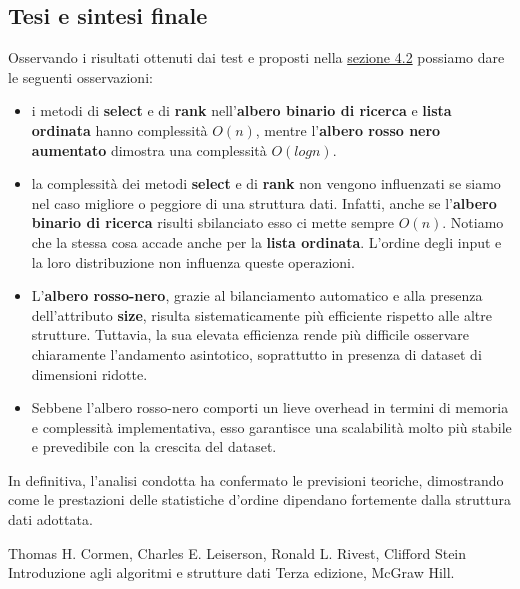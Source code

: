 \documentclass[10pt]{article}
\begin{document}
\newpage
\subsection{Tesi e sintesi finale}
Osservando i risultati ottenuti dai test e proposti nella  \hyperref[risultati sperimentali]{sezione 4.2} possiamo dare le seguenti osservazioni:
\begin{itemize}
    \item i metodi di \textbf{select} e di \textbf{rank} nell'\textbf{albero binario di ricerca} e \textbf{lista ordinata} hanno complessità $O(n)$, mentre l'\textbf{albero rosso nero aumentato} dimostra una complessità $O(logn)$.
    \item la complessità dei metodi \textbf{select} e di \textbf{rank} non vengono influenzati se siamo nel caso migliore o peggiore di una struttura dati. Infatti, anche se l'\textbf{albero binario di ricerca} risulti sbilanciato esso ci mette sempre $O(n)$. Notiamo che la stessa cosa accade anche per la \textbf{lista ordinata}.
    L'ordine degli input e la loro distribuzione non influenza queste operazioni.
    \item L'\textbf{albero rosso-nero}, grazie al bilanciamento automatico e alla presenza dell'attributo \textbf{size}, risulta sistematicamente più efficiente rispetto alle altre strutture. Tuttavia, la sua elevata efficienza rende più difficile osservare chiaramente l'andamento asintotico, soprattutto in presenza di dataset di dimensioni ridotte.
    \item Sebbene l’albero rosso-nero comporti un lieve overhead in termini di memoria e complessità implementativa, esso garantisce una scalabilità molto più stabile e prevedibile con la crescita del dataset.
\end{itemize}
In definitiva, l’analisi condotta ha confermato le previsioni teoriche, dimostrando come le prestazioni delle statistiche d’ordine dipendano fortemente dalla struttura dati adottata.
\newpage
\begin{thebibliography}{9}
\bibitem{}
Thomas H. Cormen, Charles E. Leiserson, Ronald L. Rivest, Clifford Stein Introduzione agli algoritmi e strutture dati Terza edizione, McGraw Hill.

\end{thebibliography}   
\end{document}
